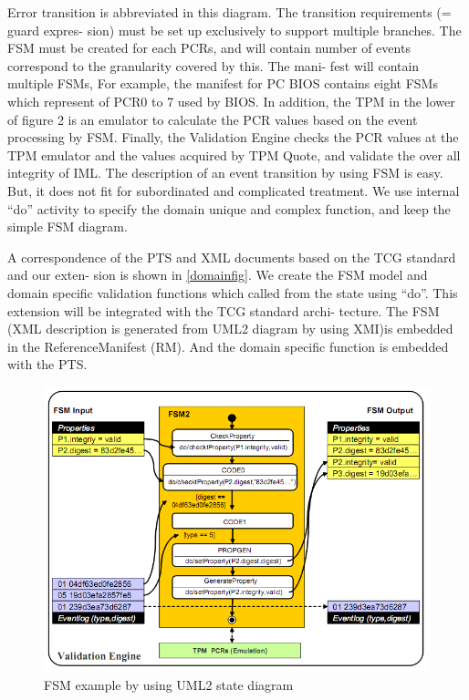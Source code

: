 \documentclass[12pt,a4paper]{article}
\begin{document}
Error transition is abbreviated in this diagram. The transition requirements (= guard expres-
sion) must be set up exclusively to support multiple branches. The FSM must be created for each
PCRs, and will contain number of events correspond to the granularity covered by this. The mani-
fest will contain multiple FSMs, For example, the manifest for PC BIOS contains eight FSMs which
represent of PCR0 to 7 used by BIOS. In addition, the TPM in the lower of figure 2 is an emulator
to calculate the PCR values based on the event processing by FSM. Finally, the Validation Engine
checks the PCR values at the TPM emulator and the values acquired by TPM Quote, and validate
the over all integrity of IML. The description of an event transition by using FSM is easy. But, it
does not fit for subordinated and complicated treatment. We use internal “do” activity to specify
the domain unique and complex function, and keep the simple FSM diagram.

A correspondence of the PTS and XML documents based on the TCG standard and our exten-
sion is shown in \ref{domainfig}. We create the FSM model and domain specific validation functions which
called from the state using “do”. This extension will be integrated with the TCG standard archi-
tecture. The FSM (XML description is generated from UML2 diagram by using XMI)is embedded
in the ReferenceManifest (RM). And the domain specific function is embedded with the PTS.

\begin{figure}[b!p]
  \begin{center}
    \includegraphics[width=15cm]{OpenPTS_fig2.png}
  \end{center}
  \caption{FSM example by using UML2 state diagram}
  \label{umlfig} 
\end{figure}
\end{document}
